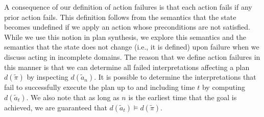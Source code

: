 \documentclass{article}
\begin{document}
A consequence of our definition of action failures is that each action fails if any prior action fails.  This definition follows from the semantics that the state becomes undefined if we apply an action whose preconditions are not satisfied.  While we use this notion in plan synthesis, we explore this semantics and the semantics that the state does not change (i.e., it is defined) upon failure when we discuss acting in incomplete domains.  The reason that we define action failures in this manner is that we can determine all failed interpretations affecting a plan $d(\tilde{\pi})$  by inspecting $d(\tilde{a}_n)$.
%
It is possible to determine the interpretations that fail to successfully execute the plan up to and including time $t$ by computing $d(\tilde{a}_t)$.  We also note that as long as $n$ is the earliest time that the goal is achieved, we are guaranteed that $d(\tilde{a}_{t}) \models d(\tilde{\pi})$.  
\end{document}

